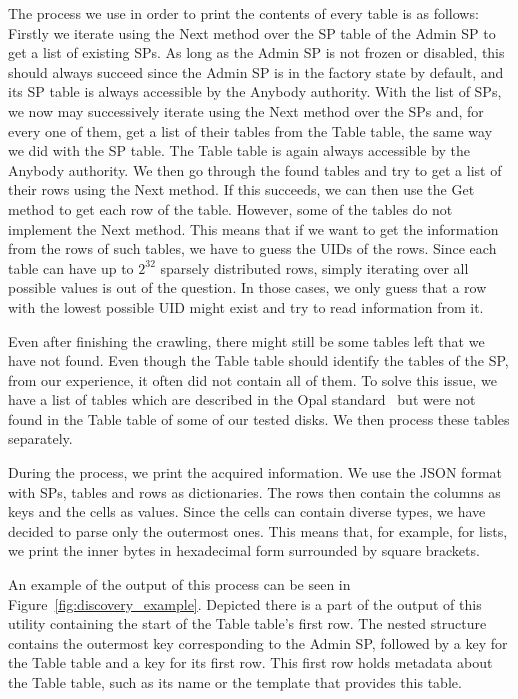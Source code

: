 The process we use in order to print the contents of every table is as follows:
Firstly we iterate using the Next method over the SP table of the Admin SP to get a list of existing SPs. As long as the Admin SP is not frozen or disabled, this should always succeed since the Admin SP is in the factory state by default, and its SP table is always accessible by the Anybody authority. 
With the list of SPs, we now may successively iterate using the Next method over the SPs and, for every one of them, get a list of their tables from the Table table, the same way we did with the SP table. The Table table is again always accessible by the Anybody authority.
We then go through the found tables and try to get a list of their rows using the Next method. If this succeeds, we can then use the Get method to get each row of the table. However, some of the tables do not implement the Next method. This means that if we want to get the information from the rows of such tables, we have to guess the UIDs of the rows. Since each table can have up to $2^{32}$ sparsely distributed rows, simply iterating over all possible values is out of the question. In those cases, we only guess that a row with the lowest possible UID might exist and try to read information from it.

Even after finishing the crawling, there might still be some tables left that we have not found. Even though the Table table should identify the tables of the SP, from our experience, it often did not contain all of them. To solve this issue, we have a list of tables which are described in the Opal standard~\cite{tcg-opal2} but were not found in the Table table of some of our tested disks. We then process these tables separately.

During the process, we print the acquired information. We use the JSON format with SPs, tables and rows as dictionaries. The rows then contain the columns as keys and the cells as values. Since the cells can contain diverse types, we have decided to 
parse only the outermost ones. This means that, for example, for lists, we print the inner bytes in hexadecimal form surrounded by square brackets.





An example of the output of this process can be seen in Figure~\ref{fig:discovery_example}. Depicted there is a part of the output of this utility containing the start of the Table table's first row. The nested structure contains the outermost key corresponding to the Admin SP, followed by a key for the Table table and a key for its first row. 
This first row holds metadata about the Table table, such as its name or the template that provides this table.


